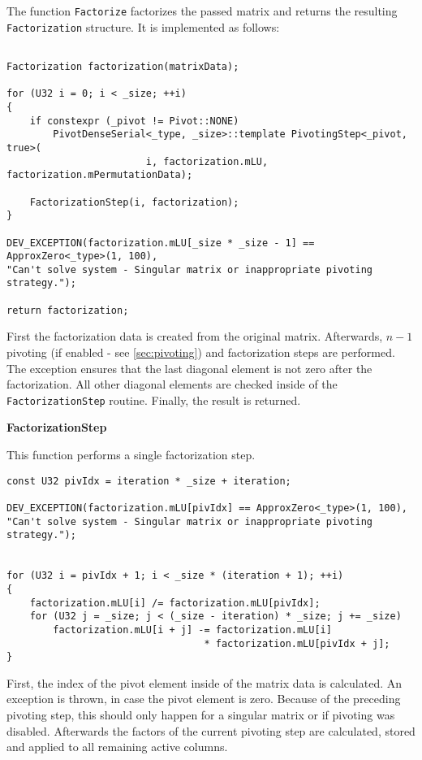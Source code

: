 The function \texttt{Factorize} factorizes the passed matrix and returns the resulting \texttt{Factorization} structure.
It is implemented as follows:
\begin{verbatim}

Factorization factorization(matrixData);

for (U32 i = 0; i < _size; ++i)
{
    if constexpr (_pivot != Pivot::NONE)
        PivotDenseSerial<_type, _size>::template PivotingStep<_pivot, true>(
                        i, factorization.mLU, factorization.mPermutationData);
                            
    FactorizationStep(i, factorization);
}
    
DEV_EXCEPTION(factorization.mLU[_size * _size - 1] == ApproxZero<_type>(1, 100),
"Can't solve system - Singular matrix or inappropriate pivoting strategy.");

return factorization;
\end{verbatim}

First the factorization data is created from the original matrix.
Afterwards, $n-1$ pivoting (if enabled - see \cref{sec:pivoting}) and factorization steps are performed.
The exception ensures that the last diagonal element is not zero after the factorization.
All other diagonal elements are checked inside of the \texttt{FactorizationStep} routine.
Finally, the result is returned.





\vspace{1cm}
\textbf{FactorizationStep}
\vspace{0.5cm}

This function performs a single factorization step.

\begin{verbatim}
const U32 pivIdx = iteration * _size + iteration;

DEV_EXCEPTION(factorization.mLU[pivIdx] == ApproxZero<_type>(1, 100),
"Can't solve system - Singular matrix or inappropriate pivoting strategy.");


for (U32 i = pivIdx + 1; i < _size * (iteration + 1); ++i)
{
    factorization.mLU[i] /= factorization.mLU[pivIdx];
    for (U32 j = _size; j < (_size - iteration) * _size; j += _size)
        factorization.mLU[i + j] -= factorization.mLU[i] 
                                  * factorization.mLU[pivIdx + j];
}
\end{verbatim}

First, the index of the pivot element inside of the matrix data is calculated.
An exception is thrown, in case the pivot element is zero.
Because of the preceding pivoting step, this should only happen for a singular matrix or if pivoting was disabled.
Afterwards the factors of the current pivoting step are calculated, stored and applied to all remaining active columns.





